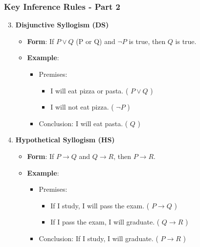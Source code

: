 \documentclass[aspectratio=169]{beamer}
\begin{document}
\begin{frame}[fragile]
  \frametitle{Key Inference Rules - Part 2}
  \begin{enumerate}
    \setcounter{enumi}{2}
    \item \textbf{Disjunctive Syllogism (DS)}  
      \begin{itemize}
        \item \textbf{Form}: If \( P \lor Q \) (P or Q) and \( \neg P \) is true, then \( Q \) is true.
        \item \textbf{Example}:
        \begin{itemize}
          \item Premises:  
            \begin{itemize}
              \item I will eat pizza or pasta. ( \( P \lor Q \) )  
              \item I will not eat pizza. ( \( \neg P \) )
            \end{itemize}
          \item Conclusion: I will eat pasta. ( \( Q \) )
        \end{itemize}
      \end{itemize}
    
    \item \textbf{Hypothetical Syllogism (HS)}  
      \begin{itemize}
        \item \textbf{Form}: If \( P \rightarrow Q \) and \( Q \rightarrow R \), then \( P \rightarrow R \).
        \item \textbf{Example}:
        \begin{itemize}
          \item Premises:  
            \begin{itemize}
              \item If I study, I will pass the exam. ( \( P \rightarrow Q \) )  
              \item If I pass the exam, I will graduate. ( \( Q \rightarrow R \) )
            \end{itemize}
          \item Conclusion: If I study, I will graduate. ( \( P \rightarrow R \) )
        \end{itemize}
      \end{itemize}
    

\end{enumerate}
\end{frame}
\end{document}

